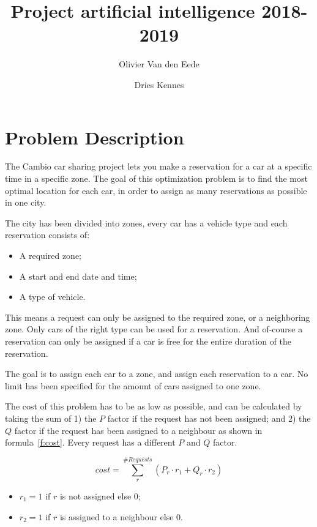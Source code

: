 \documentclass[11pt,a4paper]{article}
\begin{document}
\title{Project artificial intelligence 2018-2019}
\author[1]{Olivier Van den Eede}
\author[1]{Dries Kennes}
\date{}
\maketitle

\section{Problem Description}\label{sec:problem-description}
    The Cambio car sharing project lets you make a reservation for a car at a specific time in a specific zone.
    The goal of this optimization problem is to find the most optimal location for each car, in order to assign as many reservations as possible
    in one city.
    
    The city has been divided into zones, every car has a vehicle type and each reservation consists of:
    \begin{itemize} \itemsep-0.25em
        \item A required zone;
        \item A start and end date and time;
        \item A type of vehicle.
    \end{itemize} 

    This means a request can only be assigned to the required zone, or a neighboring zone.
    Only cars of the right type can be used for a reservation.
    And of-course a reservation can only be assigned if a car is free for the entire duration of the reservation.

    The goal is to assign each car to a zone, and assign each reservation to a car.
    No limit has been specified for the amount of cars assigned to one zone.

    The cost of this problem has to be as low as possible, and can be calculated by taking the sum of
    1) the $P$ factor if the request has not been assigned;
    and 2) the $Q$ factor if the request has been assigned to a neighbour
    as shown in formula~\ref{f:cost}.
    Every request has a different $P$ and $Q$ factor.

    \begin{equation}\label{f:cost}
        cost = \sum_{r}^{\#Requests} \left( P_r \cdot r_1 + Q_r \cdot r_2 \right)
    \end{equation}

    \begin{itemize} \itemsep-0.25em
        \item $r_1 = 1$ if $r$ is not assigned else $0$;
        \item $r_2 = 1$ if $r$ is assigned to a neighbour else $0$.
    \end{itemize}
\end{document}
